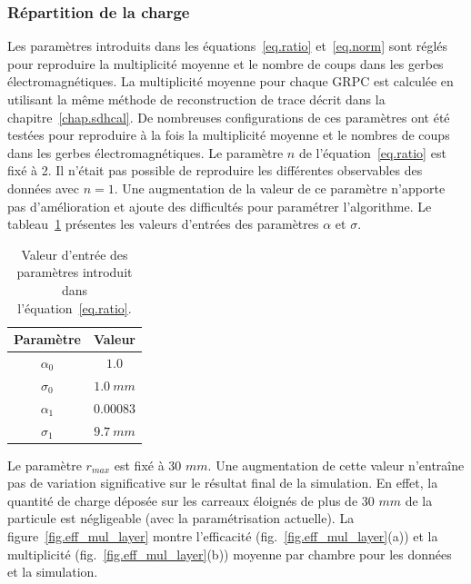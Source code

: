 \subsubsection{Répartition de la charge}
Les paramètres introduits dans les équations~\ref{eq.ratio} et~\ref{eq.norm} sont réglés pour reproduire la multiplicité moyenne et le nombre de coups dans les gerbes électromagnétiques. La multiplicité moyenne pour chaque GRPC est calculée en utilisant la même méthode de reconstruction de trace décrit dans la chapitre~\ref{chap.sdhcal}. De nombreuses configurations de ces paramètres ont été testées pour reproduire à la fois la multiplicité moyenne et le nombres de coups dans les gerbes électromagnétiques. Le paramètre $n$ de l'équation~\ref{eq.ratio} est fixé à 2. Il n'était pas possible de reproduire les différentes observables des données avec $n=1$. Une augmentation de la valeur de ce paramètre n'apporte pas d'amélioration et ajoute des difficultés pour paramétrer l'algorithme. Le tableau~\ref{tab.splitting} présentes les valeurs d'entrées des paramètres $\alpha$ et $\sigma$.
\begin{table}[!ht]
  \begin{center}
    \begin{tabular}{c|c}
      Paramètre & Valeur\\
      \hline
      $\alpha_0$ & $1.0$\\
      $\sigma_0$ & $1.0~mm$\\
      $\alpha_1$ & $0.00083$\\
      $\sigma_1$ & $9.7~mm$\\
    \end{tabular}
  \end{center}
  \caption{Valeur d'entrée des paramètres introduit dans l'équation~\ref{eq.ratio}.}
  \label{tab.splitting}
\end{table}
Le paramètre $r_{max}$ est fixé à 30 $mm$. Une augmentation de cette valeur n’entraîne pas de variation significative sur le résultat final de la simulation. En effet, la quantité de charge déposée sur les carreaux éloignés de plus de 30 $mm$ de la particule est négligeable (avec la paramétrisation actuelle). La figure~\ref{fig.eff_mul_layer} montre l'efficacité (fig.~\ref{fig.eff_mul_layer}(a)) et la multiplicité (fig.~\ref{fig.eff_mul_layer}(b)) moyenne par chambre pour les données et la simulation.
